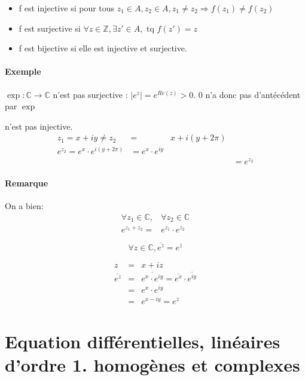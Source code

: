 \begin{itemize}
	\item f est injective si pour tous $z_1 \in A, z_2 \in A, z_1 \neq z_2 \Rightarrow f(z_1) \neq f(z_2)$

	\item f est surjective si $\forall z \in \mathbb{Z}, \exists z' \in A, \text{ tq } f(z') = z$
	\item f est bijective si elle est injective et surjective.
\end{itemize}

\paragraph{Exemple} $\exp : \mathbb{C} \rightarrow \mathbb{C}$ n'est pas surjective : $|e^z| = e^{Re(z)} > 0$. 0 n'a donc pas d'antécédent par $\exp$

n'est pas injective.
\[\begin{array}{rclr}
z_1 = x + iy \neq z_2 &=& x+i(y+2\pi) \\
e^{z_2} = e^x \cdot e^{i(y+2\pi)} &= e^x \cdot e^{iy} \\
&&& = e^{z_2}\end{array}\]

\paragraph{Remarque}
On a bien:
\[\begin{array}{rl}
	\forall z_1 \in \mathbb{C},& \forall z_2 \in\mathbb{C} \\
e^{z_1 + z_2} =& e^{z_1}\cdot e^{z_2}
\end{array}\]

\[\forall z \in \mathbb{C}, \overline{e^z} = e^{\overline{z}}\]

\[\begin{array}{rcl}
	z &=& x+iz \\
\overline{e^{z}} &=& \overline{e^x \cdot e^{iy}} = \overline{e^x} \cdot \overline{e^{iy}} \\
&=& e^x \cdot e^{iy} \\
&=& e^{x-iy} = e^{\overline{z}}\end{array}\]

\section{Equation différentielles, linéaires d'ordre 1. homogènes et complexes}

